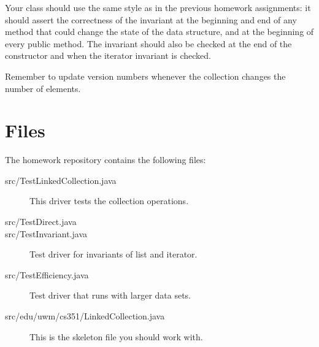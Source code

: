 \documentclass[10pt]{article}
\begin{document}
Your class should use the same style as in the previous homework
assignments: it should assert the correctness of the invariant
at the beginning and end of any method that could change the state
of the data structure, and at the beginning of every public method.
The invariant should also be checked at the end of the
constructor and when the iterator invariant is checked.

Remember to update version numbers whenever the collection changes the
number of elements.

\section{Files}

The homework repository
contains the following files:
\begin{description}
\item[src/TestLinkedCollection.java] This driver tests the collection operations.
\item[src/TestDirect.java] 
\item[src/TestInvariant.java] Test driver for invariants of list and iterator.
\item[src/TestEfficiency.java] Test driver that runs with larger data sets.
\item[src/edu/uwm/cs351/LinkedCollection.java] This is the skeleton file you should work with.
\end{description}
\end{document}
